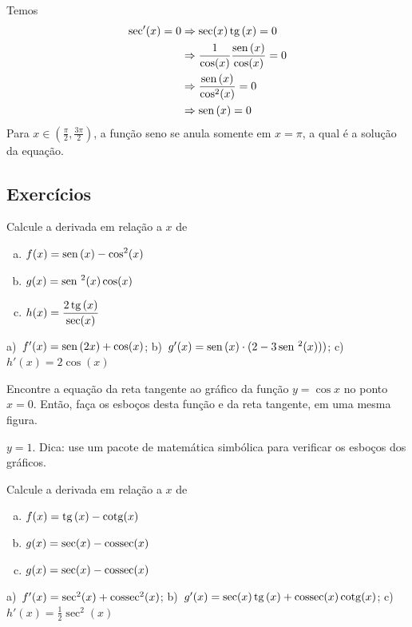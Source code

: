 \cleardoublepage\documentclass[../main.tex]{subfiles}
\begin{document}
\begin{resol}
  Temos
  \begin{align*}
    \sec'(x) = 0 &\Rightarrow \sec(x)\operatorname{tg}\,(x) = 0 \\
                 &\Rightarrow \frac{1}{\cos(x)}\frac{\operatorname{sen}\,(x)}{\cos(x)} = 0 \\
                 &\Rightarrow \frac{\operatorname{sen}\,(x)}{\cos^2(x)} = 0 \\
                 &\Rightarrow \operatorname{sen}\,(x) = 0
  \end{align*}
  Para $x\in \left(\frac{\pi}{2}, \frac{3\pi}{2}\right)$, a função seno se anula somente em $x=\pi$, a qual é a solução da equação.
\end{resol}


\subsection{Exercícios}

\begin{exer}
  Calcule a derivada em relação a $x$ de
  \begin{enumerate}[a)]
  \item $\displaystyle f(x)=\operatorname{sen}\,(x)-\cos^2(x)$
  \item $\displaystyle g(x)=\operatorname{sen}\,^2(x)\cos(x)$
  \item $\displaystyle h(x)=\frac{2\operatorname{tg}\,(x)}{\sec(x)}$
  \end{enumerate}
\end{exer}
\begin{resp}
  a)~$f'(x)=\operatorname{sen}\,(2x)+\cos(x)$; b)~$g'(x)=\operatorname{sen}\,(x)\cdot(2-3\operatorname{sen}\,^2(x)))$; c)~$h'(x)=2\cos(x)$
\end{resp}

\begin{exer}
  Encontre a equação da reta tangente ao gráfico da função $y = \cos x$ no ponto $x=0$. Então, faça os esboços desta função e da reta tangente, em uma mesma figura.  
\end{exer}
\begin{resp}
  $y = 1$. Dica: use um pacote de matemática simbólica para verificar os esboços dos gráficos.
\end{resp}

\begin{exer}
  Calcule a derivada em relação a $x$ de
  \begin{enumerate}[a)]
  \item $\displaystyle f(x)=\operatorname{tg}\,(x)-\operatorname{cotg}(x)$
  \item $\displaystyle g(x)=\sec(x)-\operatorname{cossec}(x)$
  \item $\displaystyle g(x)=\sec(x)-\operatorname{cossec}(x)$
  \end{enumerate}
\end{exer}
\begin{resp}
  a)~$f'(x)=\sec^2(x)+\operatorname{cossec}^2(x)$; b)~$g'(x)=\sec(x)\operatorname{tg}\,(x)+\operatorname{cossec}(x)\operatorname{cotg}(x)$; c)~$h'(x)=\frac{1}{2}\sec^2(x)$
\end{resp}
\end{document}
